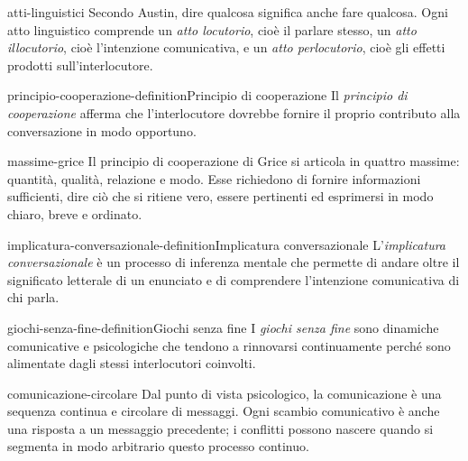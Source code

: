 \documentclass[preview]{standalone}
\begin{document}
\begin{snippet}{atti-linguistici}
    Secondo Austin, dire qualcosa significa anche fare qualcosa. Ogni atto
    linguistico comprende un \emph{atto locutorio}, cioè il parlare stesso, un
    \emph{atto illocutorio}, cioè l'intenzione comunicativa, e un
    \emph{atto perlocutorio}, cioè gli effetti prodotti sull'interlocutore.
\end{snippet}

\begin{snippetdefinition}{principio-cooperazione-definition}{Principio di cooperazione}
    Il \emph{principio di cooperazione} afferma che l'interlocutore dovrebbe
    fornire il proprio contributo alla conversazione in modo opportuno.
\end{snippetdefinition}

\begin{snippet}{massime-grice}
    Il principio di cooperazione di Grice si articola in quattro massime:
    quantità, qualità, relazione e modo. Esse richiedono di fornire informazioni
    sufficienti, dire ciò che si ritiene vero, essere pertinenti ed esprimersi in
    modo chiaro, breve e ordinato.
\end{snippet}

\begin{snippetdefinition}{implicatura-conversazionale-definition}{Implicatura conversazionale}
    L'\emph{implicatura conversazionale} è un processo di inferenza mentale che
    permette di andare oltre il significato letterale di un enunciato e di
    comprendere l'intenzione comunicativa di chi parla.
\end{snippetdefinition}

\begin{snippetdefinition}{giochi-senza-fine-definition}{Giochi senza fine}
    I \emph{giochi senza fine} sono dinamiche comunicative e psicologiche che
    tendono a rinnovarsi continuamente perché sono alimentate dagli stessi
    interlocutori coinvolti.
\end{snippetdefinition}

\begin{snippet}{comunicazione-circolare}
    Dal punto di vista psicologico, la comunicazione è una sequenza continua e
    circolare di messaggi. Ogni scambio comunicativo è anche una risposta a un
    messaggio precedente; i conflitti possono nascere quando si segmenta in modo
    arbitrario questo processo continuo.
\end{snippet}

\end{document}
